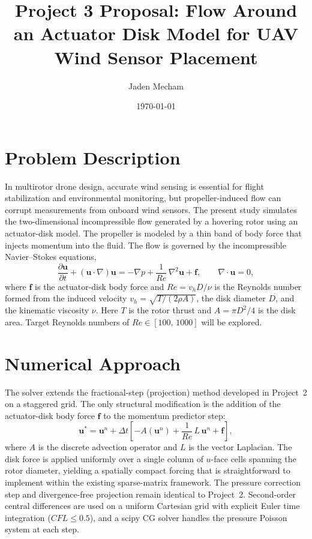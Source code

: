 \documentclass[
  aapm,
  amsmath,amssymb,
  reprint,          %
  floatfix
]{revtex4-2}
\begin{document}
\title{Project 3 Proposal: Flow Around an Actuator Disk Model for UAV Wind Sensor Placement}

\author{Jaden Mecham}

\date{\today}

\maketitle

\section{Problem Description}

In multirotor drone design, accurate wind sensing is essential for flight stabilization
and environmental monitoring, but propeller-induced flow can corrupt measurements
from onboard wind sensors.  The present study simulates the two-dimensional incompressible
flow generated by a hovering rotor using an actuator-disk model. The propeller is modeled
by a thin band of body force that injects momentum into the fluid.
The flow is governed by the incompressible Navier--Stokes equations,
\begin{equation}
  \frac{\partial \mathbf{u}}{\partial t}
  + (\mathbf{u}\cdot\nabla)\mathbf{u}
  = -\nabla p + \frac{1}{Re}\,\nabla^{2}\mathbf{u} + \mathbf{f},
  \qquad \nabla\cdot\mathbf{u} = 0,
\end{equation}
where $\mathbf{f}$ is the actuator-disk body force and
$Re = v_{h} D / \nu$ is the Reynolds number formed from the induced velocity
$v_{h} = \sqrt{T/(2\rho A)}$, the disk diameter $D$, and the kinematic viscosity $\nu$.
Here $T$ is the rotor thrust and $A = \pi D^{2}/4$ is the disk area.
Target Reynolds numbers of $Re \in [100,\,1000]$ will be explored.

\section{Numerical Approach}

The solver extends the fractional-step (projection) method developed in Project~2
on a staggered grid.  The only structural modification is the addition of the
actuator-disk body force $\mathbf{f}$ to the momentum predictor step:
\begin{equation}
  \mathbf{u}^{*} = \mathbf{u}^{n}
    + \Delta t\!\left[-A(\mathbf{u}^{n})
      + \frac{1}{Re}\,L\,\mathbf{u}^{n} + \mathbf{f}\right],
\end{equation}
where $A$ is the discrete advection operator and $L$ is the vector Laplacian.
The disk force is applied uniformly over a single column of $u$-face cells spanning
the rotor diameter, yielding a spatially compact forcing that is straightforward to
implement within the existing sparse-matrix framework.  The pressure correction step
and divergence-free projection remain identical to Project~2.
Second-order central differences are used on a uniform Cartesian grid with explicit
Euler time integration ($CFL \leq 0.5$), and a scipy CG solver handles the pressure
Poisson system at each step.
\end{document}
